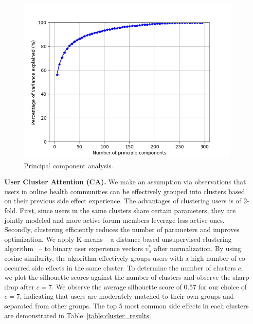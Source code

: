 \documentclass{bmcart}
\begin{document}
\begin{figure}[t!]
    \centering
    \captionsetup{justification=centering}
    \includegraphics[scale=0.5]{pca.png}
    \caption[Principal Component Analysis]{Principal component analysis.}
    \label{fig:PCA}
\end{figure}

\textbf{User Cluster Attention (CA).} We make an assumption via observations that users in online health communities can be effectively grouped into clusters based on their previous side effect experience. The advantages of clustering users is of 2-fold. First, since users in the same clusters share certain parameters, they are jointly modeled and more active forum members leverage less active ones. Secondly, clustering efficiently reduces the number of parameters and improves optimization. We apply K-means -- a distance-based unsupervised clustering algorithm~\cite{MacQueen67} -- to binary user experience vectors $v^*_u$ after normalization. 
By using cosine similarity, 
the algorithm effectively groups users with a high number of co-occurred side effects in the same cluster. To determine the number of clusters $c$, we plot the silhouette scores against the number of clusters and %
observe the sharp drop after $c=7$. 
We observe the average silhouette score of 0.57 for our choice of $c=7$, indicating that users are moderately matched to their own groups and separated from other groups. The top 5 most common side effects in each clusters are demonstrated in Table~\ref{table:cluster_results}.
\end{document}

